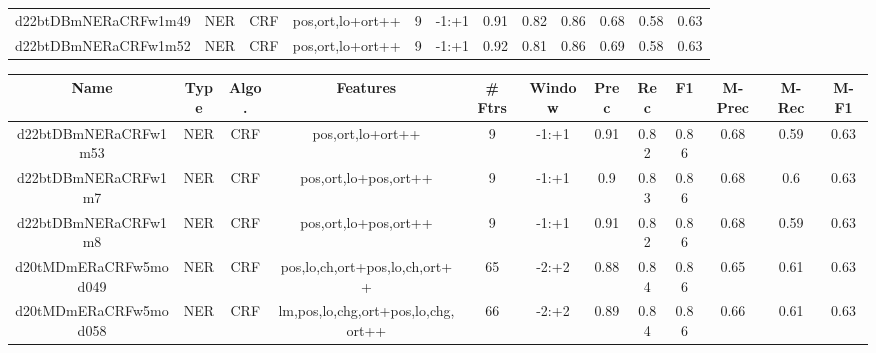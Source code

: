 \documentclass[a4paper]{article}
\begin{document}
\begin{landscape}
\begin{center}
\begin{tabular}{ |c|c|c|c|c|c|c|c|c|c|c|c|}
 	
 
 	
 		
 		\small{ d22btDBmNERaCRFw1m49 } & NER & CRF & pos,ort,lo+ort++  &  9 &  -1:+1  &  0.91 & 0.82 & 0.86  &  0.68 & 0.58 & 0.63 \\
 		

 	
 
 	
 		
 		\small{ d22btDBmNERaCRFw1m52 } & NER & CRF & pos,ort,lo+ort++  &  9 &  -1:+1  &  0.92 & 0.81 & 0.86  &  0.69 & 0.58 & 0.63 \\
 		
 \hline
\end{tabular}
\end{center}




\begin{center}
\begin{tabular}{ |c|c|c|c|c|c|c|c|c|c|c|c|} 
 \hline
 	Name & Type & Algo. & Features & \# Ftrs & Window & Prec & Rec & F1 & M-Prec & M-Rec & M-F1\\
 \hline

 		

 	
 
 	
 		
 		\small{ d22btDBmNERaCRFw1m53 } & NER & CRF & pos,ort,lo+ort++  &  9 &  -1:+1  &  0.91 & 0.82 & 0.86  &  0.68 & 0.59 & 0.63 \\
 		

 	
 
 	
 		
 		\small{ d22btDBmNERaCRFw1m7 } & NER & CRF & pos,ort,lo+pos,ort++  &  9 &  -1:+1  &  0.9 & 0.83 & 0.86  &  0.68 & 0.6 & 0.63 \\
 		

 	
 
 	
 		
 		\small{ d22btDBmNERaCRFw1m8 } & NER & CRF & pos,ort,lo+pos,ort++  &  9 &  -1:+1  &  0.91 & 0.82 & 0.86  &  0.68 & 0.59 & 0.63 \\
 		

 	
 
 	
 		
 		\small{ d20tMDmERaCRFw5mod049 } & NER & CRF & pos,lo,ch,ort+pos,lo,ch,ort++  &  65 &  -2:+2  &  0.88 & 0.84 & 0.86  &  0.65 & 0.61 & 0.63 \\
 		

 	
 
 	
 		
 		\small{ d20tMDmERaCRFw5mod058 } & NER & CRF & lm,pos,lo,chg,ort+pos,lo,chg,ort++  &  66 &  -2:+2  &  0.89 & 0.84 & 0.86  &  0.66 & 0.61 & 0.63 \\
 		


\end{tabular}
\end{center}
\end{landscape}
\end{document}
